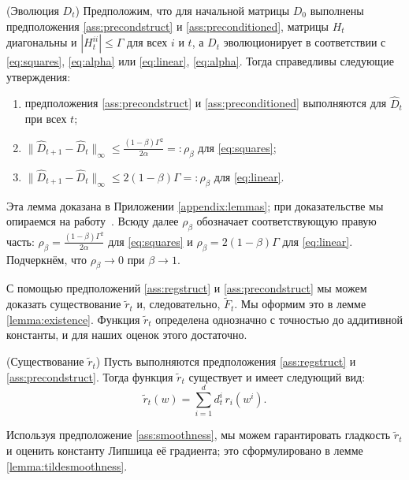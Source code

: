 \begin{lemma}
\label{lemma:Dt}
{(Эволюция $D_t$)}
    Предположим, что для начальной матрицы $D_0$ выполнены предположения \ref{ass:precondstruct} и \ref{ass:preconditioned}, матрицы $H_t$ диагональны и $|H_t^{ii}| \le \Gamma$ для всех $i$ и $t$, а $D_t$ эволюционирует в соответствии с \eqref{eq:squares}, \eqref{eq:alpha} или
    \eqref{eq:linear}, \eqref{eq:alpha}. Тогда справедливы следующие утверждения:

    \begin{enumerate}
        \item предположения \ref{ass:precondstruct} и \ref{ass:preconditioned} выполняются для $\hat{D}_t$ при всех $t$;
        \item $\|\hat{D}_{t+1} - \hat{D}_t\|_\infty \le \frac{(1 - \beta) \Gamma^2}{2\alpha} =: \rho_\beta$ для \eqref{eq:squares};
        \item $\|\hat{D}_{t+1} - \hat{D}_t\|_\infty \le 2(1 - \beta) \Gamma =: \rho_\beta$ для \eqref{eq:linear}.
    \end{enumerate}
\end{lemma}

Эта лемма доказана в Приложении \ref{appendix:lemmas}; при доказательстве мы опираемся на работу~\citep{beznosikov2022scaled}. Всюду далее $\rho_\beta$ обозначает соответствующую правую часть: $\rho_\beta = \frac{(1-\beta)\Gamma^2}{2\alpha}$ для \eqref{eq:squares} и $\rho_\beta = 2(1-\beta)\Gamma$ для \eqref{eq:linear}. Подчеркнём, что $\rho_\beta \to 0$ при $\beta \to 1$.

С помощью предположений \ref{ass:regstruct} и \ref{ass:precondstruct} мы можем доказать существование $\widetilde{r}_t$ и, следовательно, $\widetilde{F}_t$. Мы оформим это в лемме \ref{lemma:existence}. Функция $\widetilde{r}_t$ определена однозначно с точностью до аддитивной константы, и для наших оценок этого достаточно.

\begin{lemma}
\label{lemma:existence}
{(Существование $\widetilde{r}_t$)}
    Пусть выполняются предположения \ref{ass:regstruct} и \ref{ass:precondstruct}. Тогда функция $\widetilde{r}_t$ существует и имеет следующий вид:
    $$\widetilde{r}_t(w) = \sum_{i=1}^d d_t^i \, r_i(w^i).$$
\end{lemma}

Используя предположение \ref{ass:smoothness}, мы можем гарантировать гладкость $\widetilde{r}_t$ и оценить константу Липшица её градиента; это сформулировано в лемме \ref{lemma:tildesmoothness}.

